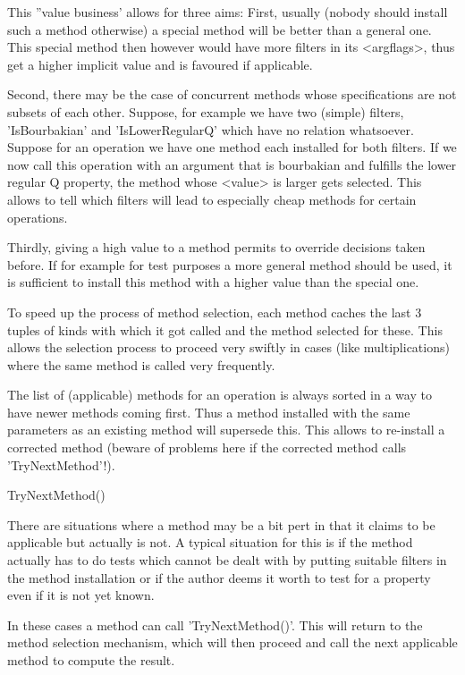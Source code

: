 This ''value business' allows for three aims: First, usually (nobody should
install such a method otherwise) a special method will be better than a
general one. This special method then however would have more filters in its 
<argflags>, thus get a higher implicit value and is favoured if applicable.

Second, there may be the case of concurrent methods whose specifications are
not subsets of each other. Suppose, for example we have two (simple) filters,
'IsBourbakian' and 'IsLowerRegularQ' which have no relation whatsoever.
Suppose for an operation we have one method each installed for both filters.
If we now call this operation with an argument that is bourbakian and
fulfills the lower regular Q property, the method whose <value> is larger
gets selected. This allows to tell {\GAP} which filters will  lead to
especially cheap methods for certain operations.

Thirdly, giving a high value to a method permits to override decisions taken
before. If for example for test purposes a more general method should be
used, it is sufficient to install this method with a higher value than the
special one.

\danger
To speed up the process of method selection, each method caches the last 3
tuples of kinds with which it got called and the method selected for these.
This allows the selection process to proceed very swiftly in cases (like
multiplications) where the same method is called very frequently.

\danger
The list of (applicable) methods for an operation is always sorted in a way
to have newer methods coming first. Thus a method installed with the same
parameters as an existing method will supersede this. This allows to
re-install a corrected method (beware of problems here if the corrected
method calls 'TryNextMethod'!).

\>TryNextMethod()

There are situations where a method may be a bit pert in that it claims to be
applicable but actually is not. A typical situation for this is if the
method actually has to do tests which cannot be dealt with by putting
suitable filters in the method installation or if the author deems it worth
to test for a property even if it is not yet known.

In these cases a method can call 'TryNextMethod()'. This will return to the
method selection mechanism, which will then proceed and call the next
applicable method to compute the result.


